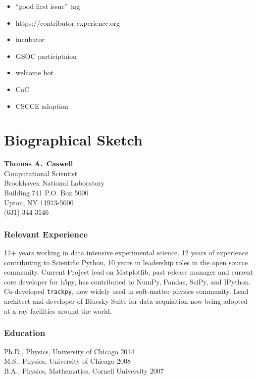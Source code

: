 \documentclass[12pt]{article}
\numberwithin{page}{section}
\begin{document}
  \begin{itemize}
  \item  ``good first issue'' tag
  \item https://contributor-experience.org
  \item incubator
  \item GSOC participtaion
  \item welcome bot
  \item CoC
  \item CSCCE adoption
  \end{itemize}





\newpage
\section{Biographical Sketch}
\setcounter{page}{1}
\begin{center}
  \textbf{Thomas A.\ Caswell}\\
  Computational Scientist\\
  Brookhaven National Laboratory\\
  Building 741 P.O. Box 5000\\
  Upton, NY 11973-5000\\
  (631) 344-3146\\
\end{center}

\subsubsection*{Relevant Experience}
17+ years working in data intensive experimental science.  12 years of
experience contributing to Scientific Python, 10 years in leadership roles in
the open source community.  Current Project lead on Matplotlib, past release
manager and current core developer for h5py, has contributed to NumPy, Pandas,
SciPy, and IPython.  Co-developed \texttt{trackpy}, now widely used in
soft-matter physics community.  Lead architect and developer of Bluesky Suite
for data acquisition now being adopted at x-ray facilities around the world.

\subsubsection*{Education}
Ph.D., Physics, University of Chicago \hfill 2014\\
M.S., Physics, University of Chicago \hfill 2008\\
B.A., Physics, Mathematics, Cornell University \hfill 2007
\end{document}
